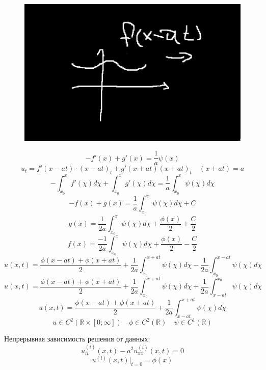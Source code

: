 \documentclass[a4paper]{article}
\begin{document}
\begin{figure}[!htb]
    \centering
    \includegraphics[scale=0.5]{figures/mp-lec-4-10-fig1.png}
    \caption{}
\end{figure}

\[
    -f'(x) + g'(x) = \frac{1}{a} \psi(x)
\]
\[
    u_{t} = f'(x-at) \cdot (x - at)_{t} + g'(x+at) (x+at)_{t} \quad (x+at) = a
\]
\[
    -\int_{x_0}^{x} f'(\chi)d\chi + \int_{x_0}^{x} g'(\chi)d\chi = 
    \frac{1}{a} \int_{x_0}^{x} \psi(\chi)d\chi
\]
\begin{equation}
    -f(x) + g(x) = \frac{1}{a} \int_{x_0}^{x} \psi(\chi)d\chi + C
\end{equation}
\[
    g(x) = \frac{1}{2a} \int_{x_0}^{x} \psi(\chi)d\chi + \frac{\phi(x)}{2} + \frac{C}{2} 
\]
\[
    f(x) = \frac{-1}{2a} \int_{x_0}^{x} \psi(\chi)d\chi + \frac{\phi(x)}{2} - \frac{C}{2} 
\]
\[
    u(x,t) = \frac{\phi(x-at)+\phi(x+at)}{2} + \frac{1}{2a} 
    \int_{x_0}^{x+at} \psi(\chi)d\chi - \frac{1}{2a} \int_{x_0}^{x-at}\psi(\chi)d\chi 
\]
\[
    u(x,t) = \frac{\phi(x-at)+\phi(x+at)}{2} + \frac{1}{2a} 
    \int_{x_0}^{x+at} \psi(\chi)d\chi + \frac{1}{2a} \int_{x-at}^{x_0}\psi(\chi)d\chi 
\]
\begin{equation}
    u(x,t) = \frac{\phi(x-at)+\phi(x+at)}{2} + \frac{1}{2a} 
    \int_{x-at}^{x+at} \psi(\chi)d\chi 
\end{equation}
\[
    u \in C^2(\mathbb{R} \times [0;\infty]) \quad \phi \in C^2(\mathbb{R})
    \quad \psi \in C^{1}(\mathbb{R})
\]

Непрерывная зависимость решения от данных:\\
\[
    u_{tt}^{(i)}(x,t) - a^2 u_{xx}^{(i)}(x,t) = 0
\]
\[
    u^{(i)}(x,t) |_{t=0} = \phi(x)
\]
\end{document}
